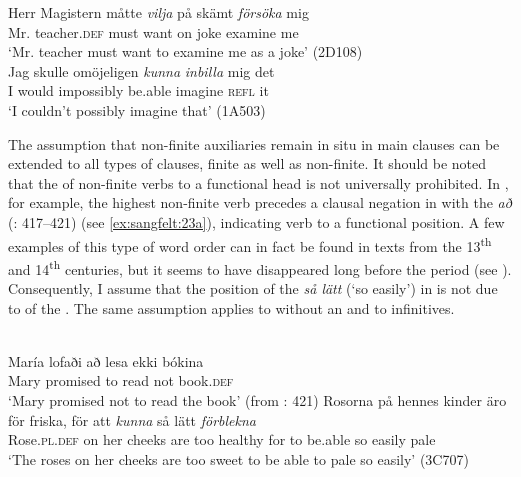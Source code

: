 \documentclass[output=paper, colorlinks, citecolor=brown]{langscibook}
\begin{document}
\ea\label{ex:sangfelt:22}
\ea\label{ex:sangfelt:22a}
\gll Herr Magistern måtte \textit{vilja} {på} {skämt} \textit{försöka} mig \\ %
 Mr. teacher.\textsc{def} must want on joke examine me\\
\glt ‘Mr. teacher must want to examine me as a joke’ (2D108)\\
\ex\label{ex:sangfelt:22b}
\gll Jag skulle {omöjeligen} \textit{kunna} \textit{inbilla} mig det \\
 I would impossibly be.able imagine \textsc{refl} it\\
\glt ‘I couldn’t possibly imagine that’ (1A503)
\z
\z


The assumption that non-finite auxiliaries remain in situ in main clauses can be extended to all types of clauses, finite as well as non-finite. It should be noted that the  of non-finite verbs to a functional head is not universally prohibited. In , for example, the highest non-finite verb precedes a clausal negation in  with the  \textit{að} (\citealt{Thrainsson2007}: 417–421) (see \ref{ex:sangfelt:23a}), indicating verb  to a functional position. A few examples of this type of word order can in fact be found in  texts from the 13\textsuperscript{th} and 14\textsuperscript{th} centuries, but it seems to have disappeared long before the  period (see \cites[161]{Delsing1999}[]{Falk2010Studier}[141]{Kalm2016Satsekvivalenta}). Consequently, I assume that the position of the  \textit{så lätt} (‘so easily’) in  is not due to  of the . The same assumption applies to  without an  and to  infinitives.


\ea \label{ex:sangfelt:23}
\ea {}\label{ex:sangfelt:23a}\\
\gll María lofaði að lesa {ekki} bókina \\
 Mary promised to read not book.\textsc{def}\\
\glt ‘Mary promised not to read the book’ (from \citealt{Thrainsson2007}: 421)
\ex\label{ex:sangfelt:23b} \gll Rosorna på hennes kinder äro för friska, för att \textit{kunna} så lätt \textit{förblekna} \\
 Rose.\textsc{pl.def} on her cheeks are too healthy for to be.able so easily pale\\
\glt ‘The roses on her cheeks are too sweet to be able to pale so easily’ (3C707)
\z 
\z
\end{document}
